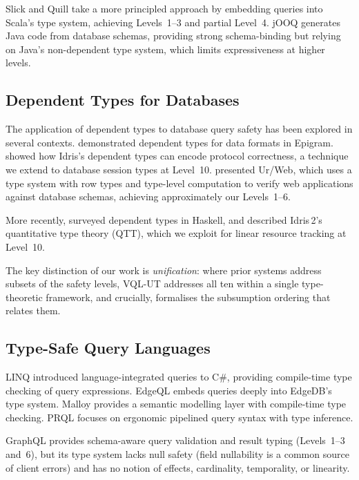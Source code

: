 \documentclass[11pt,a4paper]{article}
\newcommand{\VQL}{\textsc{VQL-UT}}
\begin{document}
Slick \citep{slick2023docs} and Quill \citep{ioffe2017quill}
take a more principled approach by embedding queries into Scala's type
system, achieving Levels~1--3 and partial Level~4.  jOOQ
\citep{jooq2023docs} generates Java code from database schemas,
providing strong schema-binding but relying on Java's non-dependent
type system, which limits expressiveness at higher levels.

\subsection{Dependent Types for Databases}

The application of dependent types to database query safety has been
explored in several contexts.  \citet{oury2008power} demonstrated
dependent types for data formats in Epigram.
\citet{brady2013idris} showed how Idris's dependent types can encode
protocol correctness, a technique we extend to database session types
at Level~10.  \citet{chlipala2010ur} presented Ur/Web, which uses a
type system with row types and type-level computation to verify web
applications against database schemas, achieving approximately our
Levels~1--6.

More recently, \citet{weirich2017dependent} surveyed dependent types in
Haskell, and \citet{cockx2021idris2} described Idris\,2's quantitative
type theory (QTT), which we exploit for linear resource tracking at
Level~10.

The key distinction of our work is \emph{unification}: where prior
systems address subsets of the safety levels, \VQL{} addresses all ten
within a single type-theoretic framework, and crucially, formalises the
subsumption ordering that relates them.

\subsection{Type-Safe Query Languages}

LINQ \citep{meijer2006linq} introduced language-integrated queries to
C\#, providing compile-time type checking of query expressions.
EdgeQL \citep{edgedb2023docs} embeds queries deeply into EdgeDB's
type system.  Malloy \citep{malloy2023docs} provides a semantic
modelling layer with compile-time type checking.  PRQL
\citep{prql2023docs} focuses on ergonomic pipelined query syntax with
type inference.

GraphQL \citep{graphql2023spec} provides schema-aware query validation
and result typing (Levels~1--3 and~6), but its type system lacks null
safety (field nullability is a common source of client errors) and has
no notion of effects, cardinality, temporality, or linearity.
\end{document}
